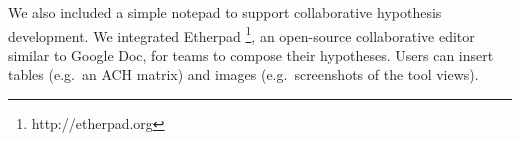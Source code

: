 \documentclass[]{article}
\begin{document}
We also included a simple notepad to support collaborative hypothesis
development. We integrated Etherpad \footnote{http://etherpad.org}, an
open-source collaborative editor similar to Google Doc, for teams to
compose their hypotheses. Users can insert tables (e.g.~an ACH matrix)
and images (e.g.~screenshots of the tool views).

\printbibliography
\end{document}
